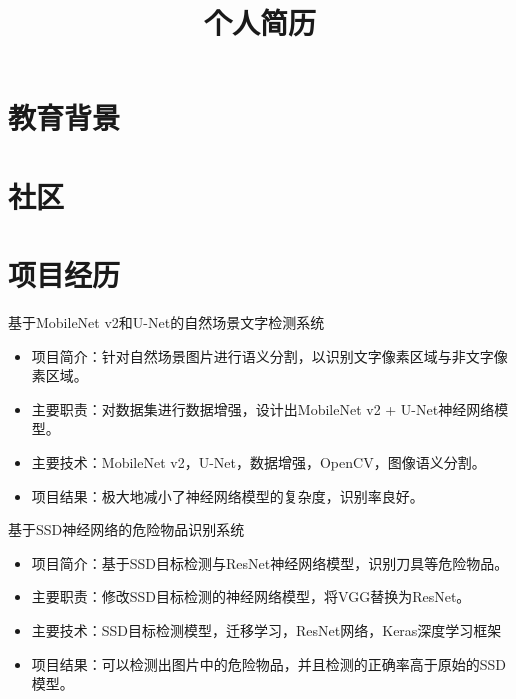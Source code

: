 \documentclass[11pt, a4paper]{moderncv}
\title{个人简历}
\begin{document}
	\maketitle
	
	\section{教育背景}

	\section{社区}
	
	\section{项目经历}
	{基于MobileNet v2和U-Net的自然场景文字检测系统}
	{}{}{}{
		\begin{itemize}
			\item 项目简介：针对自然场景图片进行语义分割，以识别文字像素区域与非文字像素区域。
			\item 主要职责：对数据集进行数据增强，设计出MobileNet v2 + U-Net神经网络模型。
			\item 主要技术：MobileNet v2，U-Net，数据增强，OpenCV，图像语义分割。
			\item 项目结果：极大地减小了神经网络模型的复杂度，识别率良好。
		\end{itemize}}{}	  

	{基于SSD神经网络的危险物品识别系统}
	{}{}{}{
		\begin{itemize}
			\item 项目简介：基于SSD目标检测与ResNet神经网络模型，识别刀具等危险物品。
			\item 主要职责：修改SSD目标检测的神经网络模型，将VGG替换为ResNet。
			\item 主要技术：SSD目标检测模型，迁移学习，ResNet网络，Keras深度学习框架
			\item 项目结果：可以检测出图片中的危险物品，并且检测的正确率高于原始的SSD模型。
	\end{itemize}}{}
\end{document}

